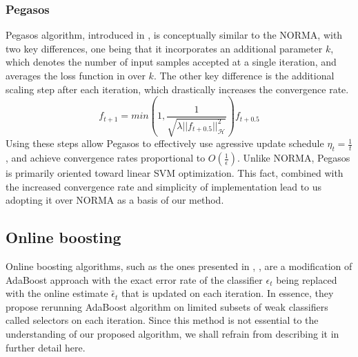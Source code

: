 \subsubsection{Pegasos}
Pegasos algorithm, introduced in \cite{Pegasos}, is conceptually similar to the NORMA, with two key differences,
one being that it incorporates an additional parameter $k$, which denotes the number of input samples accepted at a single iteration, and averages the loss function in  over $k$. The other key difference is the additional scaling step after each iteration, which drastically increases the convergence rate.
$$
f_{t+1}=min(1,\frac{1}{\sqrt{\lambda ||f_{t+0.5}||_{\mathscr{H}}^2}})f_{t+0.5}
$$
Using these steps allow Pegasos to effectively use agressive update schedule $\eta_t=\frac{1}{t}$, and achieve convergence rates proportional to $O(\frac{1}{\epsilon})$. 
Unlike NORMA, Pegasos is primarily oriented toward linear SVM optimization. This fact, combined with the increased convergence rate and simplicity of implementation lead to us adopting it over NORMA as a basis of our method. 

\subsection {Online boosting}

Online boosting algorithms, such as the ones presented in \cite{grabner2006}, \cite{grabner2008},  are a modification of AdaBoost approach with the exact error rate of the classifier $\epsilon_t$ being replaced with the online  estimate $\tilde{\epsilon_t}$ that is updated on each iteration. In essence, they propose rerunning AdaBoost algorithm on limited subsets of weak classifiers called selectors on each iteration. Since this method is not essential to the understanding of our proposed algorithm, we shall refrain from describing it in further detail here. 
